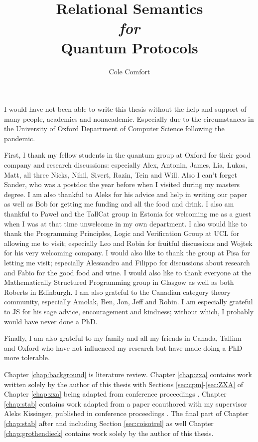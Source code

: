 \documentclass[12pt]{ociamthesis}  %
\title{Relational Semantics \\{ \it \Large for}\\ Quantum Protocols}
\author{Cole Comfort}
\begin{document}
\maketitle



\begin{acknowledgements}

I would have not been able to write this thesis without the help and support of many people, academics and nonacademic.  Especially due to the circumstances in the University of  Oxford Department of Computer Science following the pandemic.

First, I thank my fellow students in the quantum group at  Oxford for their good company and research discussions: especially Alex,  Antonin, James, Lia, Lukas, Matt, all three Nicks, Nihil, Sivert, Razin, Tein and Will.  Also I can't forget Sander, who was a postdoc the year before when I visited during my masters degree.
I am also thankful to Aleks for his advice and help in writing our paper as well as Bob for getting me funding and all the  food and drink.
I also am thankful to Pawe\l{} and the TallCat group in Estonia for welcoming me as a guest when I was at that time unwelcome in my own department.  I also would like to thank the Programming Principles, Logic and Verification Group at UCL for allowing me to visit; especially Leo and Robin for fruitful discussions and Wojtek for his very welcoming company. I would also like to thank the group at Pisa for letting me visit; especially Alessandro and Filippo for discussions about research and Fabio for the good food and wine. I would also like to thank everyone at the Mathematically Structured Programming group in Glasgow as well as both Roberts in Edinburgh.
I am also grateful to the Canadian category theory community, especially Amolak, Ben, Jon, Jeff and Robin.  I am especially grateful to JS for his sage advice, encouragement and kindness; without which, I probably would have never done a PhD.

Finally, I am also grateful to my family and all my friends in Canada, Tallinn and Oxford who have not influenced my research but have made doing a PhD more tolerable.

\end{acknowledgements}



\begin{originality}
Chapter \ref{chap:background} is  literature review.  Chapter \ref{chap:zxa} contains work written solely by the author of this thesis with Sections \ref{sec:cpm}-\ref{sec:ZXA} of Chapter \ref{chap:zxa} being adapted from conference proceedings \cite{zxa}.  Chapter \ref{chap:stab} contains work adapted from a paper coauthored with my supervisor Aleks Kissinger, published in conference proceedings \cite{lagrel}.  The final part of Chapter  \ref{chap:stab} after and including Section \ref{sec:coisotrel} as well Chapter \ref{chap:grothendieck} contains work solely by the author of this thesis.
\end{originality}
\end{document}

